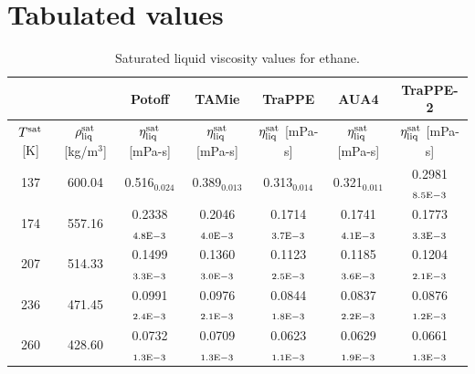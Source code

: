 \documentclass[preprint,review,11pt]{elsarticle}
\begin{document}
    \clearpage
    \newpage

	\section{Tabulated values} \label{SI:Tabulated}
	
	\begin{table}[H]
		\caption{Saturated liquid viscosity values for ethane.}
		\begin{center}
			\begin{tabular}{|c|c|c|c|c|c|c|}
				\hline
				&                                       & Potoff            & TAMie             & TraPPE 	& AUA4	& TraPPE-2            \\ \hline
				$T^{\rm sat}$ {[}K{]} & $\rho^{\rm sat}_{\rm liq}$ [kg/m$^3$] & $\eta_{\rm liq}^{\rm sat}$ {[}mPa-s{]} & $\eta_{\rm liq}^{\rm sat}$ {[}mPa-s{]} & $\eta_{\rm liq}^{\rm sat}$ {[}mPa-s{]} & $\eta_{\rm liq}^{\rm sat}$ {[}mPa-s{]} & $\eta_{\rm liq}^{\rm sat}$ {[}mPa-s{]} \\ \hline
				137 & 600.04 & 0.516$_{0.024}$   & 0.389$_{0.013}$   & 0.313$_{0.014}$   & 0.321$_{0.011}$   & 0.2981$_{8.5 \rm E-3}$ \\ \hline
				174 & 557.16 & 0.2338$_{4.8 \rm E-3}$ & 0.2046$_{4.0 \rm E-3}$ & 0.1714$_{3.7 \rm E-3}$ & 0.1741$_{4.1 \rm E-3}$ & 0.1773$_{3.3 \rm E-3}$ \\ \hline
				207 & 514.33 & 0.1499$_{3.3 \rm E-3}$ & 0.1360$_{3.0 \rm E-3}$ & 0.1123$_{2.5 \rm E-3}$ & 0.1185$_{3.6 \rm E-3}$ & 0.1204$_{2.1 \rm E-3}$ \\ \hline
				236 & 471.45 & 0.0991$_{2.4 \rm E-3}$ & 0.0976$_{2.1 \rm E-3}$ & 0.0844$_{1.8 \rm E-3}$ & 0.0837$_{2.2 \rm E-3}$ & 0.0876$_{1.2 \rm E-3}$ \\ \hline
				260 & 428.60 & 0.0732$_{1.3 \rm E-3}$ & 0.0709$_{1.3 \rm E-3}$ & 0.0623$_{1.1 \rm E-3}$ & 0.0629$_{1.9 \rm E-3}$ & 0.0661$_{1.3 \rm E-3}$ \\ \hline
			\end{tabular}
		\end{center}
	\end{table}
\end{document}

